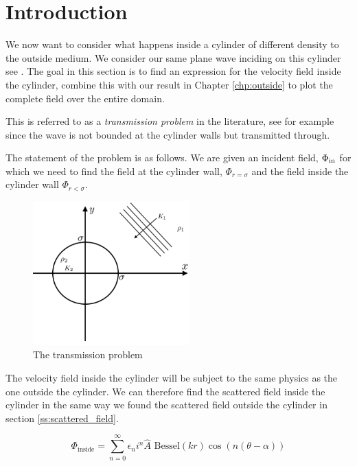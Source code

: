 %
\section{Introduction}
We now want to consider what happens inside a cylinder of different density to the outside medium. We consider our same plane wave inciding on this cylinder see . The goal in this section is to find an expression for the velocity field inside the cylinder, combine this with our result in Chapter \ref{chp:outside} to plot the complete field over the entire domain. \par
%
This is referred to as a \emph{transmission problem} in the literature, see for example \cite[$\S$1.3.3]{martin06scattering} since the wave is not bounded at the cylinder walls but transmitted through. \par
%
The statement of the problem is as follows. We are given an incident field, $\Phi_{\text{in}}$ for which we need to find the field at the cylinder wall, $\Phi_{r=\sigma}$ and the field inside the cylinder wall $\Phi_{r<\sigma}$.
%
  \begin{figure} \centering
    \includegraphics[width=6cm]{prob2/prob2_figures/prob2_sketch.png}
    \caption{The transmission problem}\label{fig:problem_2}
  \end{figure}
%
The velocity field inside the cylinder will be subject to the same physics as the one outside the cylinder. We can therefore find the scattered field inside the cylinder in the same way we found the scattered field outside the cylinder in section \ref{ss:scattered_field}. \par
%
  \begin{equation}
    \Phi_{\text{inside}} = \sum^\infty_{n=0} \epsilon_n i^n \hat{A} \text{ Bessel}(kr) \cos(n(\theta-\alpha))
  \end{equation}
